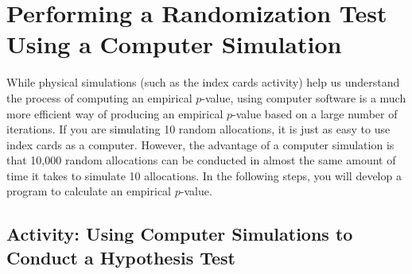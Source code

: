 \documentclass[
]{book}
\begin{document}
\hypertarget{performing-a-randomization-test-using-a-computer-simulation}{%
\section{Performing a Randomization Test Using a Computer Simulation}\label{performing-a-randomization-test-using-a-computer-simulation}}

While physical simulations (such as the index cards activity) help us understand the process of computing an empirical \(p\)-value, using computer software is a much more efficient way of producing an empirical \(p\)-value based on a large number of iterations. If you are simulating 10 random allocations, it is just as easy to use index cards as a computer. However, the advantage of a computer simulation is that 10,000 random allocations can be conducted in almost the same amount of time it takes to simulate 10 allocations. In the following steps, you will develop a program to calculate an empirical \(p\)-value.

\hypertarget{activity-using-computer-simulations-to-conduct-a-hypothesis-test}{%
\subsection*{Activity: Using Computer Simulations to Conduct a Hypothesis Test}\label{activity-using-computer-simulations-to-conduct-a-hypothesis-test}}
\end{document}
